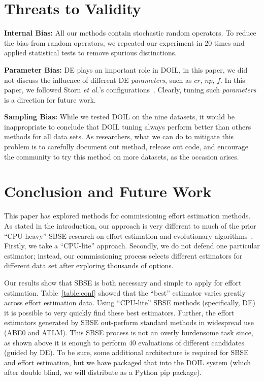 \documentclass[10pt,conference]{IEEEtran}
\begin{document}
\section{Threats to Validity}\label{sect:threats}
 \textbf{Internal Bias:} All our methods contain stochastic random operators. To reduce the bias from random operators, we 
repeated our experiment in 20 times and applied statistical tests to remove spurious distinctions.

 \textbf{Parameter Bias:} DE plays an important role in DOIL, in this paper, we did not discuss the influence of different DE
{\em parameters}, such as $cr$, $np$, $f$. In this paper, we followed Storn {\it et al.}'s configurations~\cite{storn1997differential}. Clearly, tuning such {\em parameters} is
a direction for  future work.


\textbf{Sampling Bias:} While we tested DOIL on the nine datasets, it would be inappropriate to conclude that DOIL tuning  always perform better than
others methods for all data sets.
As researchers, what we can do to mitigate this problem is to carefully document out method, release out code,
and encourage the community to try this method on more datasets, as the occasion arises.


\section{Conclusion and Future Work} \label{sect:conclusion}

This paper has explored   methods for commissioning effort estimation methods. 
As stated in the introduction, our approach is very different to much of the prior 
``CPU-heavy'' SBSE research
on effort estimation and evolutionary algorithms~\cite{BURGESS2001863,879821,5635145,5598118,Lefley:2003:UGP:1756582.1756742,sarro2017adaptive,8255666,shen02a,sarro2016multi,minku2013analysis}. Firstly, we take a  ``CPU-lite'' approach. Secondly, we do not defend one particular estimator; instead, our commissioning process selects     different estimators for different data set  after exploring thousands of options.

Our results show that SBSE is both necessary and simple to apply for effort estimation. Table~\ref{table:conf} showed that the ``best'' estimator varies greatly across effort estimation data.
Using ``CPU-lite'' SBSE methods (specifically, DE) 
it is possible to very quickly find these best estimators.
Further, the effort estimators generated by SBSE  out-perform standard methods in widespread use (ABE0 and ATLM). 
This SBSE process is not an overly burdensome task since, 
as shown above it is  enough to   perform  40 evaluations of different candidates (guided by DE).
To be sure,  some additional architecture is required for SBSE and effort estimation, but  we have packaged  that into the DOIL system
(which after double blind, we will  distribute as a Python pip package). 
\end{document}

